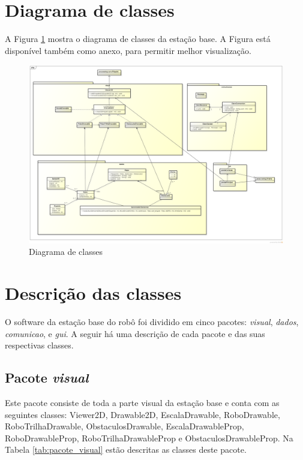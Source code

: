 \section{Diagrama de classes}

A Figura \ref{fig:diagrama_classes} mostra o diagrama de classes da estação base. A Figura está disponível também como anexo, para permitir melhor visualização.

\begin{figure}[h]
  \centering
  \includegraphics[width=\textwidth]{./figuras/diagrama_classes.png}
  \caption{Diagrama de classes}
  \label{fig:diagrama_classes}
\end{figure}

\section{Descrição das classes}
O software da estação base do robô foi dividido em cinco pacotes:  \textit{visual}, \textit{dados}, \textit{comunicao}, e \textit{gui}. A seguir há uma descrição de cada pacote e das suas respectivas classes.


\subsection{Pacote \textit{visual}}

Este pacote consiste de toda a parte visual da estação base e conta com as seguintes classes: Viewer2D, Drawable2D, EscalaDrawable, RoboDrawable, RoboTrilhaDrawable, ObstaculosDrawable, EscalaDrawableProp, RoboDrawableProp, RoboTrilhaDrawableProp e ObstaculosDrawableProp. Na Tabela \ref{tab:pacote_visual} estão descritas as classes deste pacote.


